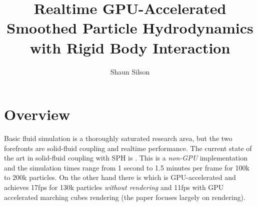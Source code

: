\documentclass[10pt,a4paper,draft]{article}
\author{Shaun Silson}
\title{Realtime GPU-Accelerated Smoothed Particle Hydrodynamics with Rigid Body Interaction}
\begin{document}
\maketitle








\section{Overview}
Basic fluid simulation is a thoroughly saturated research area, but the two forefronts are solid-fluid coupling and realtime performance. The current state of the art in solid-fluid coupling with SPH is \cite{Akinci2012}. This is a \textit{non-GPU} implementation and the simulation times range from 1 second to 1.5 minutes per frame for 100k to 200k particles. On the other hand there is \cite{Goswami2010} which is GPU-accelerated and achieves 17fps for 130k particles \textit{without rendering} and 11fps with GPU accelerated marching cubes rendering (the paper focuses largely on rendering).\newline
\end{document}
